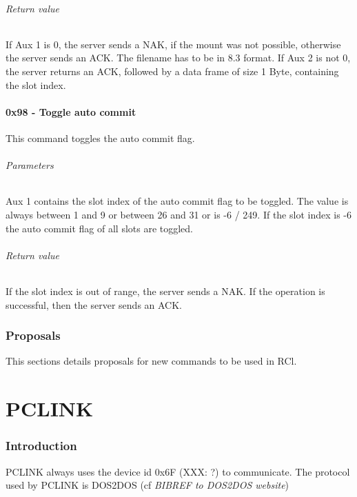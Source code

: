 \documentclass[10pt]{article}
\begin{document}
\paragraph{Return value}
If Aux 1 is 0, the server sends a NAK, if the mount was not possible, otherwise the server sends an ACK. The filename has to be in 8.3 format.
If Aux 2 is not 0, the server returns an ACK, followed by a data frame of size 1 Byte, containing the slot index.

\subsection{0x98 - Toggle auto commit}
This command toggles the auto commit flag.

\paragraph{Parameters}
Aux 1 contains the slot index of the auto commit flag to be toggled. The value is always between 1 and 9 or between 26 and 31 or is -6 / 249. If the slot index is -6 the auto commit flag of all slots are toggled.

\paragraph{Return value}
If the slot index is out of range, the server sends a NAK.
If the operation is successful, then the server sends an ACK.

\section{Proposals}
This sections details proposals for new commands to be used in RCl.

\part{PCLINK}
\section{Introduction}
PCLINK always uses the device id 0x6F (XXX: ?) to communicate. The protocol used by PCLINK is DOS2DOS (cf {\em BIBREF to DOS2DOS website})
\end{document}
